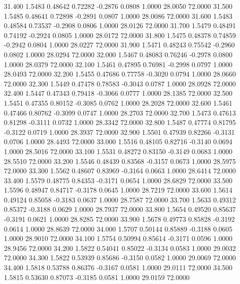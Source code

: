   31.400   1.5483   0.48642   0.72282  -0.2876   0.0808   1.0000  28.0050  72.0000
  31.500   1.5485   0.48641   0.72898  -0.2891   0.0807   1.0000  28.0086  72.0000
  31.600   1.5483   0.48584   0.73537  -0.2908   0.0806   1.0000  28.0126  72.0000
  31.700   1.5479   0.48491   0.74192  -0.2924   0.0805   1.0000  28.0172  72.0000
  31.800   1.5475   0.48378   0.74859  -0.2942   0.0804   1.0000  28.0227  72.0000
  31.900   1.5471   0.48243   0.75542  -0.2960   0.0802   1.0000  28.0294  72.0000
  32.000   1.5467   0.48083   0.76246  -0.2978   0.0800   1.0000  28.0379  72.0000
  32.100   1.5461   0.47895   0.76981  -0.2998   0.0797   1.0000  28.0493  72.0000
  32.200   1.5455   0.47686   0.77758  -0.3020   0.0794   1.0000  28.0660  72.0000
  32.300   1.5449   0.47478   0.78583  -0.3043   0.0787   1.0000  28.0928  72.0000
  32.400   1.5447   0.47343   0.79418  -0.3066   0.0777   1.0000  28.1385  72.0000
  32.500   1.5451   0.47355   0.80152  -0.3085   0.0762   1.0000  28.2028  72.0000
  32.600   1.5461   0.47466   0.80762  -0.3099   0.0747   1.0000  28.2703  72.0000
  32.700   1.5473   0.47613   0.81298  -0.3111   0.0732   1.0000  28.3342  72.0000
  32.800   1.5487   0.47774   0.81795  -0.3122   0.0719   1.0000  28.3937  72.0000
  32.900   1.5501   0.47939   0.82266  -0.3131   0.0706   1.0000  28.4493  72.0000
  33.000   1.5516   0.48105   0.82716  -0.3140   0.0694   1.0000  28.5016  72.0000
  33.100   1.5531   0.48272   0.83150  -0.3149   0.0683   1.0000  28.5510  72.0000
  33.200   1.5546   0.48439   0.83568  -0.3157   0.0673   1.0000  28.5975  72.0000
  33.300   1.5562   0.48607   0.83969  -0.3164   0.0663   1.0000  28.6414  72.0000
  33.400   1.5579   0.48775   0.84353  -0.3171   0.0654   1.0000  28.6829  72.0000
  33.500   1.5596   0.48947   0.84717  -0.3178   0.0645   1.0000  28.7219  72.0000
  33.600   1.5614   0.49124   0.85058  -0.3183   0.0637   1.0000  28.7587  72.0000
  33.700   1.5633   0.49312   0.85372  -0.3188   0.0629   1.0000  28.7937  72.0000
  33.800   1.5654   0.49520   0.85637  -0.3191   0.0621   1.0000  28.8285  72.0000
  33.900   1.5678   0.49773   0.85828  -0.3192   0.0614   1.0000  28.8639  72.0000
  34.000   1.5707   0.50144   0.85889  -0.3188   0.0605   1.0000  28.9010  72.0000
  34.100   1.5754   0.50994   0.85614  -0.3171   0.0596   1.0000  28.9456  72.0000
  34.200   1.5822   0.54041   0.85022  -0.3134   0.0583   1.0000  29.0032  72.0000
  34.300   1.5822   0.53939   0.85686  -0.3150   0.0582   1.0000  29.0069  72.0000
  34.400   1.5818   0.53788   0.86376  -0.3167   0.0581   1.0000  29.0111  72.0000
  34.500   1.5815   0.53630   0.87073  -0.3185   0.0581   1.0000  29.0159  72.0000
